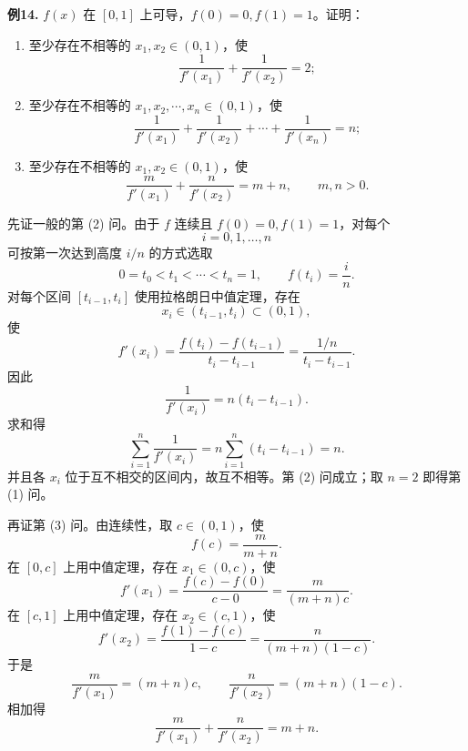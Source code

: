 \begin{problemblock}
\textbf{例14.} \(f(x)\) 在 \([0,1]\) 上可导，\(f(0)=0,f(1)=1\)。证明：
\begin{enumerate}[label=(\arabic*), leftmargin=2.2em]
\item 至少存在不相等的 \(x_1,x_2\in(0,1)\)，使
\[
\frac1{f'(x_1)}+\frac1{f'(x_2)}=2;
\]
\item 至少存在不相等的 \(x_1,x_2,\cdots,x_n\in(0,1)\)，使
\[
\frac1{f'(x_1)}+\frac1{f'(x_2)}+\cdots+\frac1{f'(x_n)}=n;
\]
\item 至少存在不相等的 \(x_1,x_2\in(0,1)\)，使
\[
\frac{m}{f'(x_1)}+\frac{n}{f'(x_2)}=m+n,\qquad m,n>0.
\]
\end{enumerate}
\end{problemblock}
\begin{solutionblock}
先证一般的第 (2) 问。由于 \(f\) 连续且 \(f(0)=0,f(1)=1\)，对每个
\[
i=0,1,\ldots,n
\]
可按第一次达到高度 \(i/n\) 的方式选取
\[
0=t_0<t_1<\cdots<t_n=1,
\qquad
f(t_i)=\frac{i}{n}.
\]
对每个区间 \([t_{i-1},t_i]\) 使用拉格朗日中值定理，存在
\[
x_i\in(t_{i-1},t_i)\subset(0,1),
\]
使
\[
f'(x_i)=\frac{f(t_i)-f(t_{i-1})}{t_i-t_{i-1}}
=\frac{1/n}{t_i-t_{i-1}}.
\]
因此
\[
\frac1{f'(x_i)}=n(t_i-t_{i-1}).
\]
求和得
\[
\sum_{i=1}^n\frac1{f'(x_i)}
=n\sum_{i=1}^n(t_i-t_{i-1})
=n.
\]
并且各 \(x_i\) 位于互不相交的区间内，故互不相等。第 (2) 问成立；取 \(n=2\) 即得第 (1) 问。

再证第 (3) 问。由连续性，取 \(c\in(0,1)\)，使
\[
f(c)=\frac{m}{m+n}.
\]
在 \([0,c]\) 上用中值定理，存在 \(x_1\in(0,c)\)，使
\[
f'(x_1)=\frac{f(c)-f(0)}{c-0}
=\frac{m}{(m+n)c}.
\]
在 \([c,1]\) 上用中值定理，存在 \(x_2\in(c,1)\)，使
\[
f'(x_2)=\frac{f(1)-f(c)}{1-c}
=\frac{n}{(m+n)(1-c)}.
\]
于是
\[
\frac{m}{f'(x_1)}=(m+n)c,\qquad
\frac{n}{f'(x_2)}=(m+n)(1-c).
\]
相加得
\[
\frac{m}{f'(x_1)}+\frac{n}{f'(x_2)}=m+n.
\]
\end{solutionblock}

